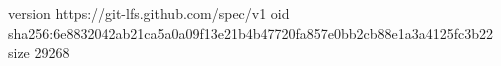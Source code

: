 version https://git-lfs.github.com/spec/v1
oid sha256:6e8832042ab21ca5a0a09f13e21b4b47720fa857e0bb2cb88e1a3a4125fc3b22
size 29268
